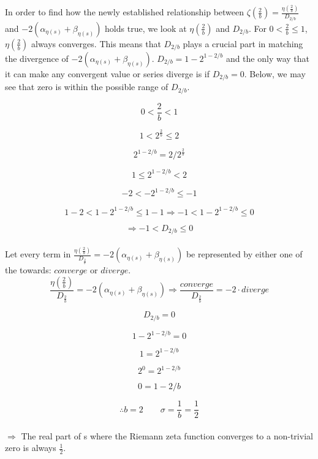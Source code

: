 \documentclass{amsart}
\begin{document}
	In order to find how the newly established relationship between  $\zeta(\frac{2}{b}) = \frac{\eta( \frac{2}{b} )}{D_{2/b}}$ and $-2(\alpha_{\eta(s)} + \beta_{\eta(s)})$ holds true, we look at $\eta(\frac{2}{b})$ and $D_{2/b}$. For $0 < \frac{2}{b} \leq 1$, $\eta(\frac{2}{b})$ always converges. This means that $D_{2/b}$ plays a crucial part in matching the divergence of $-2(\alpha_{\eta(s)} + \beta_{\eta(s)})$. $D_{2/b} = 1 - 2^{1-{2/b}}$ and the only way that it can make any convergent value or series diverge is if $D_{2/b} = 0$. Below, we may see that zero is within the possible range of $D_{2/b}$.
	
	\[ 0 < \frac{2}{b} < 1 \]
	
	\[ 1 < 2^{\frac{2}{b}} \leq 2 \]
	
	\[ 2^{1-2/b} = 2 / 2^{\frac{2}{b}} \]
	
	\[ 1 \leq 2^{1-2/b} < 2 \]
	
	\[ -2 < -2^{1-2/b} \leq -1 \]
	
	\[ 1-2 < 1-2^{1-2/b} \leq 1-1 \Rightarrow -1 < 1-2^{1-2/b} \leq 0  \] 
	
	\[\Rightarrow -1 < D_{2/b} \leq 0  \] 
	\\
		
	Let every term in $\frac{\eta( \frac{2}{b} )}{D_{\frac{2}{b}}} = - 2(\alpha_{\eta(s)} + \beta_{\eta(s)})$ be represented by either one of the towards: $converge$ or $diverge$.
	\[\]
	\[ \frac{\eta( \frac{2}{b} )}{D_{\frac{2}{b}}} = - 2(\alpha_{\eta(s)} + \beta_{\eta(s)}) \Rightarrow \frac{converge}{D_{\frac{2}{b}}} = - 2 \cdot diverge \]
	
	\[ D_{2/b} = 0 \]
	
	\[ 1-2^{1-2/b} = 0 \]
	
	\[ 1 = 2^{1-2/b} \]
	
	\[ 2^0 = 2^{1-2/b} \]
	
	\[ 0 = 1-2/b \]
	
	\[ \therefore b=2 \qquad \sigma = \frac{1}{b} = \frac{1}{2} \]
	\\
	$\Rightarrow$ The real part of s where the Riemann zeta function converges to a non-trivial zero is always $\frac{1}{2}$.
	
	
\end{document}
